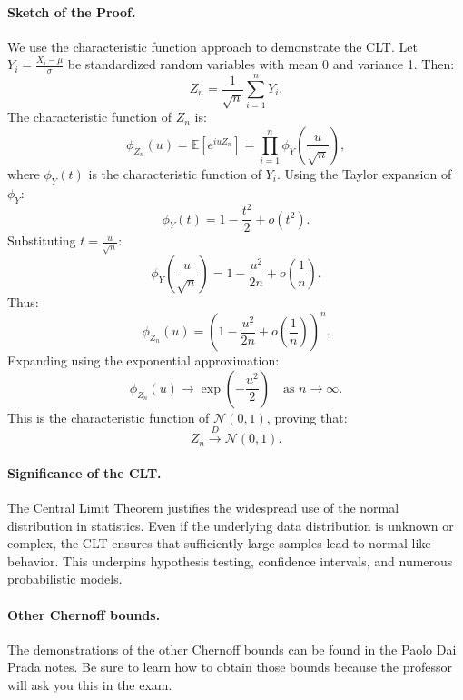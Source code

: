 \paragraph{Sketch of the Proof.}
We use the characteristic function approach to demonstrate the CLT. \newline
Let \(Y_i = \frac{X_i - \mu}{\sigma}\) be standardized random variables with mean 0 and variance 1. Then:
\[
Z_n = \frac{1}{\sqrt{n}} \sum_{i=1}^n Y_i.
\]
The characteristic function of \(Z_n\) is:
\[
\phi_{Z_n}(u) = \mathbb{E}\left[e^{iu Z_n}\right] = \prod_{i=1}^n \phi_Y\left(\frac{u}{\sqrt{n}}\right),
\]
where \(\phi_Y(t)\) is the characteristic function of \(Y_i\). Using the Taylor expansion of \(\phi_Y\):
\[
\phi_Y(t) = 1 - \frac{t^2}{2} + o(t^2).
\]
Substituting \(t = \frac{u}{\sqrt{n}}\):
\[
\phi_Y\left(\frac{u}{\sqrt{n}}\right) = 1 - \frac{u^2}{2n} + o\left(\frac{1}{n}\right).
\]
Thus:
\[
\phi_{Z_n}(u) = \left(1 - \frac{u^2}{2n} + o\left(\frac{1}{n}\right)\right)^n.
\]
Expanding using the exponential approximation:
\[
\phi_{Z_n}(u) \to \exp\left(-\frac{u^2}{2}\right) \quad \text{as } n \to \infty.
\]
This is the characteristic function of \(\mathcal{N}(0, 1)\), proving that:
\[
Z_n \xrightarrow{D} \mathcal{N}(0, 1).
\]

\paragraph{Significance of the CLT.}
The Central Limit Theorem justifies the widespread use of the normal distribution in statistics. Even if the underlying data distribution is unknown or complex, the CLT ensures that sufficiently large samples lead to normal-like behavior. This underpins hypothesis testing, confidence intervals, and numerous probabilistic models.

\paragraph{Other Chernoff bounds.} The demonstrations of the other Chernoff bounds can be found in the Paolo Dai Prada notes. Be sure to learn how to obtain those bounds because the professor will ask you this in the exam.




